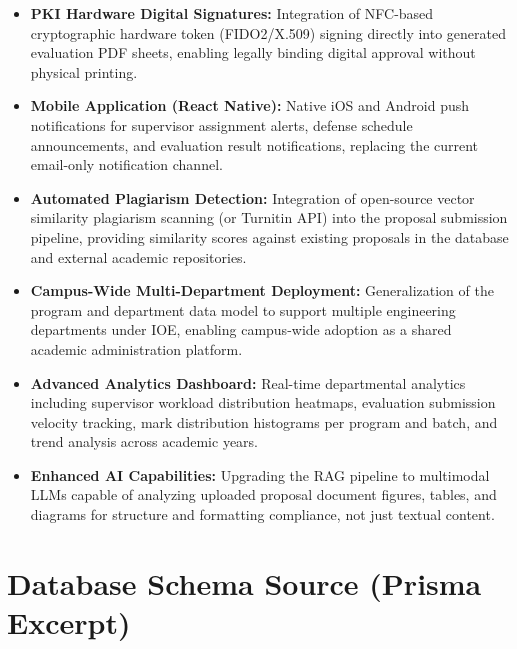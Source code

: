 \documentclass[12pt]{report}
\begin{document}
\begin{itemize}[leftmargin=*]
  \item \textbf{PKI Hardware Digital Signatures:} Integration of NFC-based cryptographic hardware token (FIDO2/X.509) signing directly into generated evaluation PDF sheets, enabling legally binding digital approval without physical printing.

  \item \textbf{Mobile Application (React Native):} Native iOS and Android push notifications for supervisor assignment alerts, defense schedule announcements, and evaluation result notifications, replacing the current email-only notification channel.

  \item \textbf{Automated Plagiarism Detection:} Integration of open-source vector similarity plagiarism scanning (or Turnitin API) into the proposal submission pipeline, providing similarity scores against existing proposals in the database and external academic repositories.

  \item \textbf{Campus-Wide Multi-Department Deployment:} Generalization of the program and department data model to support multiple engineering departments under IOE, enabling campus-wide adoption as a shared academic administration platform.

  \item \textbf{Advanced Analytics Dashboard:} Real-time departmental analytics including supervisor workload distribution heatmaps, evaluation submission velocity tracking, mark distribution histograms per program and batch, and trend analysis across academic years.

  \item \textbf{Enhanced AI Capabilities:} Upgrading the RAG pipeline to multimodal LLMs capable of analyzing uploaded proposal document figures, tables, and diagrams for structure and formatting compliance, not just textual content.
\end{itemize}

\renewcommand{\bibname}{References}



\appendix

\chapter{Database Schema Source (Prisma Excerpt)}
\end{document}
